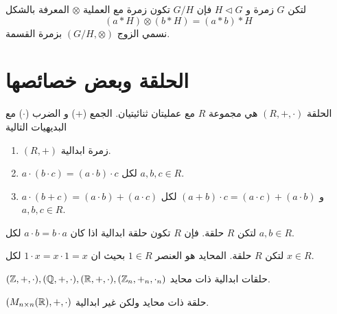 \begin{definition}
	لتكن $G$ زمرة و $H \triangleleft G$ فإن $G/H$ تكون زمرة مع العملية $\otimes$ المعرفة بالشكل
	\[
	(a*H)\otimes(b*H) = (a*b)*H
	\]
	نسمي الزوج $(G/H, \otimes)$ بزمرة القسمة.
\end{definition}

\section{الحلقة وبعض خصائصها}

\begin{definition}
	الحلقة $(R, +, \cdot)$ هي مجموعة $R$ مع عمليتان ثنائيتيان. الجمع (+) و الضرب ($\cdot$) مع البديهيات التالية
	\begin{enumerate}
		\item $(R, +)$ زمرة ابدالية.
		\item $a\cdot(b\cdot c) = (a\cdot b)\cdot c$ لكل $a, b, c\in R$.
		\item $a\cdot(b+c) = (a\cdot b) + (a\cdot c)$ و $(a+b)\cdot c = (a\cdot c) + (a\cdot b)$ لكل $a, b, c\in R$. 
	\end{enumerate}
\end{definition}

\begin{definition}
	لتكن $R$ حلقة. فإن $R$ تكون حلقة ابدالية اذا كان $a\cdot b = b\cdot a$ لكل $a, b\in R$.
\end{definition} 

\begin{definition}
	لتكن $R$ حلقة. المحايد هو العنصر $1\in R$ بحيث ان $1\cdot x= x\cdot1=x$ لكل $x\in R$.
\end{definition}

\begin{example}
	$(\mathbb{Z}, +, \cdot), (\mathbb{Q}, +, \cdot), (\mathbb{R}, +, \cdot), (\mathbb{Z}_n, +_n, \cdot_n)$ حلقات ابدالية ذات محايد.
\end{example}

\begin{example}
	$(M_{n\times n}(\mathbb{R}), +, \cdot)$ حلقة ذات محايد ولكن غير ابدالية.
\end{example}
